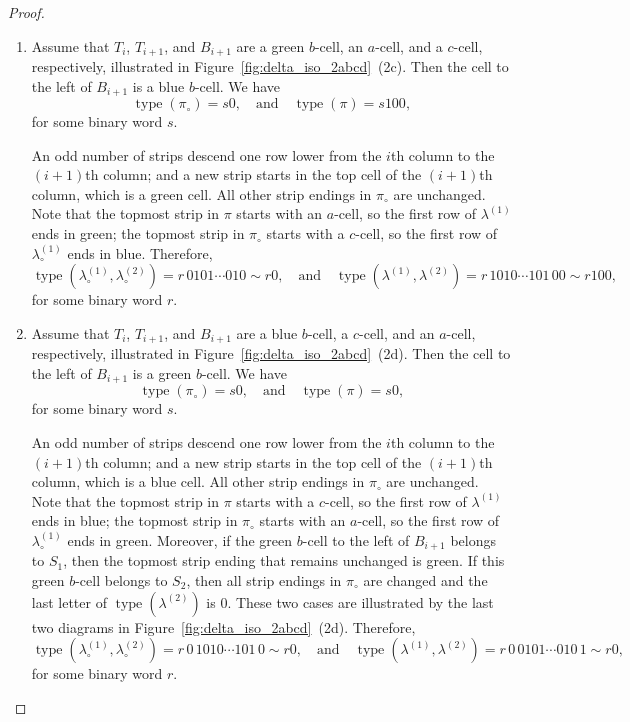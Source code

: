 \documentclass[11pt]{article}
\theoremstyle{definition}
\theoremstyle{remark}
\theoremstyle{definition}
\numberwithin{equation}{section}
\newcommand{\type}{\operatorname{type}}
\newcommand\qand{\quad\text{and}\quad}
\begin{document}
\begin{proof}
\begin{enumerate}[label=(2\alph*)]
\item Assume that \( T_i \), \( T_{i+1} \), and \( B_{i+1} \) are a green \( b \)-cell, an \( a \)-cell, and a \( c \)-cell, respectively,
  illustrated in Figure~\ref{fig:delta_iso_2abcd}~(2c). Then the cell to the
  left of \( B_{i+1} \) is a blue \(b\)-cell. We have
  \[
    \type(\pi_\circ)=s0, \qand \type(\pi)=s100,
  \]
  for some binary word \(s\).

  An odd number of strips descend one row lower from the \(i\)th
  column to the \((i+1)\)th column; and a new strip starts in the top
  cell of the \((i+1)\)th column, which is a green cell. All other
  strip endings in \(\pi_\circ\) are unchanged. Note that the topmost
  strip in \(\pi\) starts with an \(a\)-cell, so the first row of
  \(\lambda^{(1)}\) ends in green; the topmost strip in \(\pi_\circ\)
  starts with a \(c\)-cell, so the first row of \(\lambda_\circ^{(1)}\)
  ends in blue. Therefore,
  \[
    \type(\lambda_\circ^{(1)},\lambda_\circ^{(2)})=r\,0101\cdots010\sim r0, \qand \type(\lambda^{(1)},\lambda^{(2)})=r\,1010\cdots101\,00\sim r100,
  \]
  for some binary word \(r\). 

\item Assume that \( T_i \), \( T_{i+1} \), and \( B_{i+1} \) are a blue \( b \)-cell, a \( c \)-cell, and an \( a \)-cell, respectively,
  illustrated in Figure~\ref{fig:delta_iso_2abcd}~(2d). Then the cell to the
  left of \( B_{i+1} \) is a green \(b\)-cell. We have
  \[
    \type(\pi_\circ)=s0, \qand \type(\pi)=s0,
  \]
  for some binary word \(s\).

  An odd number of strips descend one row lower from the \(i\)th
  column to the \((i+1)\)th column; and a new strip starts in the top
  cell of the \((i+1)\)th column, which is a blue cell. All other
  strip endings in \(\pi_\circ\) are unchanged. Note that the topmost
  strip in \(\pi\) starts with a \(c\)-cell, so the first row of
  \(\lambda^{(1)}\) ends in blue; the topmost strip in \(\pi_\circ\)
  starts with an \(a\)-cell, so the first row of \(\lambda_\circ^{(1)}\)
  ends in green. Moreover, if the green \(b\)-cell to the left of
  \( B_{i+1} \) belongs to \(S_1\), then the topmost strip ending that
  remains unchanged is green. If this green \(b\)-cell
  belongs to \(S_2\), then all strip endings in \(\pi_\circ\) are
  changed and the last letter of \(\type(\lambda^{(2)})\) is \(0\). These
  two cases are illustrated by the last two diagrams in
  Figure~\ref{fig:delta_iso_2abcd}~(2d). Therefore,
  \[
    \type(\lambda_\circ^{(1)},\lambda_\circ^{(2)})=r\,0\,1010\cdots101\,0\sim
    r0, \qand \type(\lambda^{(1)},\lambda^{(2)})=r\,0\,0101\cdots010\,1\sim r0,
  \]
 for some binary word \(r\).


\end{enumerate}
\end{proof}
\end{document}
